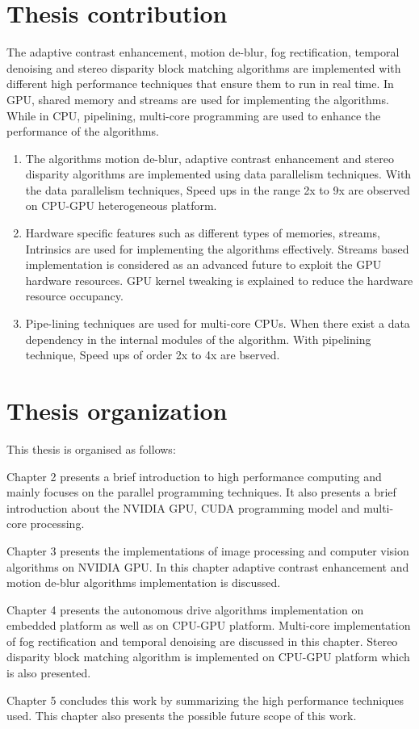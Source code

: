 \section{Thesis contribution}
The adaptive contrast enhancement, motion de-blur, fog rectification, temporal denoising and stereo disparity block matching algorithms are implemented with different high performance techniques that ensure them to run in real time. In GPU, shared memory and streams are used for implementing the algorithms. While in CPU, pipelining, multi-core programming are used to enhance the performance of the algorithms.
\begin{enumerate}
\item The algorithms motion de-blur, adaptive contrast enhancement and stereo disparity algorithms are implemented using data parallelism techniques. With the data parallelism techniques, Speed ups in the range 2x to 9x are observed on CPU-GPU heterogeneous platform.

\item Hardware specific features such as different types of memories, streams, Intrinsics are used for implementing the algorithms effectively. Streams based implementation is considered as an advanced future to exploit the GPU hardware resources. GPU kernel tweaking is explained to reduce the hardware resource occupancy.

\item Pipe-lining techniques are used for multi-core CPUs. When there exist a data dependency in the internal modules of the algorithm. With pipelining technique, Speed ups of order 2x to 4x are bserved.
\end{enumerate}
\section{Thesis organization}
This thesis is organised as follows:

\par Chapter 2 presents a brief introduction to high performance computing and mainly focuses on the parallel programming techniques. It also presents a brief introduction about the NVIDIA GPU, CUDA programming model and multi-core processing.

\par Chapter 3 presents the implementations of image processing and computer vision algorithms on NVIDIA GPU. In this chapter adaptive contrast enhancement and motion de-blur algorithms implementation is discussed.

\par Chapter 4 presents the autonomous drive algorithms implementation on embedded platform as well as on CPU-GPU platform. Multi-core implementation of fog rectification and temporal denoising are discussed in this chapter. Stereo disparity block matching algorithm is implemented on CPU-GPU platform which is also presented.

\par Chapter 5 concludes this work by summarizing the high performance techniques used. This chapter also presents the possible future scope of this work.